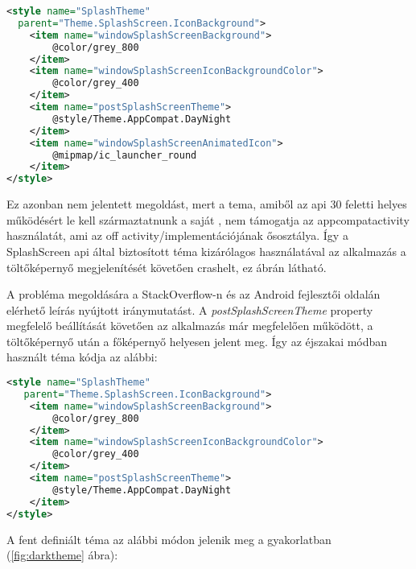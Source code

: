 \begin{lstlisting}[frame=single,language=xml,emph={style,item},
    emphstyle=\color{BurntOrange}\textbf,stringstyle=\color{OliveGreen}\textbf]
<style name="SplashTheme"
  parent="Theme.SplashScreen.IconBackground">
    <item name="windowSplashScreenBackground">
        @color/grey_800
    </item>
    <item name="windowSplashScreenIconBackgroundColor">
        @color/grey_400
    </item>
    <item name="postSplashScreenTheme">
        @style/Theme.AppCompat.DayNight
    </item>
    <item name="windowSplashScreenAnimatedIcon">
        @mipmap/ic_launcher_round
    </item>
</style>
\end{lstlisting}

Ez azonban nem jelentett megoldást, mert a \gls{tema}, amiből az \acrshort{api} 30 feletti helyes működésért
le kell származtatnunk a saját , nem támogatja az \gls{appcompat}\gls{activity} használatát, ami
az \acrlong{off} activity\-/implementációjának ősosztálya. Így a SplashScreen \acrshort{api} által biztosított
téma kizárólagos használatával az alkalmazás a töltőképernyő megjelenítését követően crashelt,
ez \az{\ref{fig:appcompatcrash}} ábrán látható.

A probléma megoldására a StackOverflow-n és az Android fejlesztői oldalán elérhető leírás
nyújtott iránymutatást. A \textit{postSplashScreenTheme} property megfelelő beállítását követően
az alkalmazás már megfelelően működött, a töltőképernyő után a főképernyő helyesen jelent meg.
Így az éjszakai módban használt téma kódja az alábbi:

\begin{lstlisting}[frame=single,language=xml,emph={style,item},
    emphstyle=\color{BurntOrange}\textbf,stringstyle=\color{OliveGreen}\textbf]
 <style name="SplashTheme"
   parent="Theme.SplashScreen.IconBackground">
    <item name="windowSplashScreenBackground">
        @color/grey_800
    </item>
    <item name="windowSplashScreenIconBackgroundColor">
        @color/grey_400
    </item>
    <item name="postSplashScreenTheme">
        @style/Theme.AppCompat.DayNight
    </item>
</style>
\end{lstlisting}

A fent definiált téma az alábbi módon jelenik meg a gyakorlatban (\ref{fig:darktheme} ábra):


